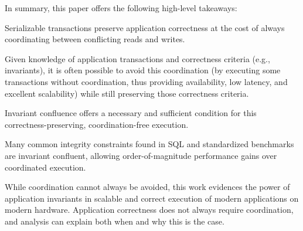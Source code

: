 In summary, this paper offers the following high-level takeaways:
\begin{introenumerate}



\item Serializable transactions preserve application correctness at
  the cost of always coordinating between conflicting reads and writes.

\item Given knowledge of application transactions and correctness
  criteria (e.g., invariants), it is often possible to avoid this
  coordination (by executing some transactions without coordination,
  thus providing availability, low latency, and excellent scalability)
  while still preserving those correctness criteria.

\item Invariant confluence offers a necessary and sufficient
  condition for this correctness-preserving, coordination-free execution.

\item Many common integrity constraints found in SQL and standardized
  benchmarks are invariant confluent, allowing order-of-magnitude
  performance gains over coordinated execution.

\end{introenumerate}
While coordination cannot always be avoided, this work evidences the
power of application invariants in scalable and correct
execution of modern applications on modern hardware. Application
correctness does 
not always require coordination, and \iconfluence analysis can explain 
both when and why this is the case.


